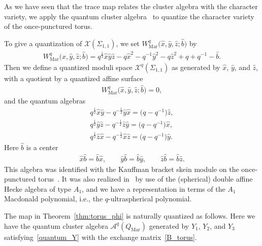 \documentclass[10pt,a4paper]{amsart}
\numberwithin{equation}{section}
\begin{document}
As we have seen that the trace map relates the cluster algebra with the character variety, we apply the quantum cluster algebra~\cite{BerenZelev05a,FockGonc09a} to quantize the character variety of the once-punctured torus.

To give a quantization of $\mathcal{X}(\Sigma_{1,1})$, we set $W_{\text{Mar}}^q\big(\hat{x},\hat{y},\hat{z}; \hat{b}\big)$ by
\begin{gather*}
 W_{\text{Mar}}^q\big(\hat{x},\hat{y},\hat{z}; \hat{b}\big) = q^{\frac{1}{2}} \hat{x} \hat{y} \hat{z} - q {\hat{x}}^2 - q^{-1} {\hat{y}}^2 - q {\hat{z}}^2 + q+q^{-1} - \hat{b} .
\end{gather*}
Then we define a quantized moduli space $\mathcal{X}^q(\Sigma_{1,1})$ as generated by $\hat{x}$, $\hat{y}$, and $\hat{z}$, with a quotient by a quantized affine surface
\begin{gather*}
 W_{\text{Mar}}^q\big(\hat{x}, \hat{y}, \hat{z}; \hat{b}\big)=0 ,
\end{gather*}
and the quantum algebras
 \begin{gather*}
 q^{\frac{1}{2}} \hat{x} \hat{y} - q^{-\frac{1}{2}} \hat{y} \hat{x} = \big( q-q^{-1} \big) \hat{z} , \\
 q^{\frac{1}{2}} \hat{y} \hat{z} - q^{-\frac{1}{2}} \hat{z} \hat{y} = \big( q-q^{-1} \big) \hat{x} , \\
 q^{\frac{1}{2}} \hat{z} \hat{x} - q^{-\frac{1}{2}} \hat{x} \hat{z} = \big( q-q^{-1} \big) \hat{y} .
\end{gather*}
Here $\hat{b}$ is a center
\begin{gather*}
 \hat{x} \hat{b} = \hat{b} \hat{x} , \qquad \hat{y} \hat{b} = \hat{b} \hat{y} , \qquad \hat{z} \hat{b} = \hat{b} \hat{z} .
\end{gather*}
This algebra was identified with the Kauffman bracket skein module on the once-punctured torus~\cite{BulloPrzyt99a}. It was also realized in~\cite{Oblom04a} by use of the (spherical) double affine Hecke algebra of type $A_1$, and we have a representation in terms of the $A_1$ Macdonald polynomial, i.e., the $q$-ultraspherical polynomial.

The map in Theorem~\ref{thm:torus_phi} is naturally quantized as follows. Here we have the quantum cluster algebra $\mathcal{A}^q(Q_{\text{Mar}})$ generated by $Y_1$, $Y_2$, and $Y_3$ satisfying~\eqref{quantum_Y} with the exchange matrix~\eqref{B_torus}.
\end{document}
